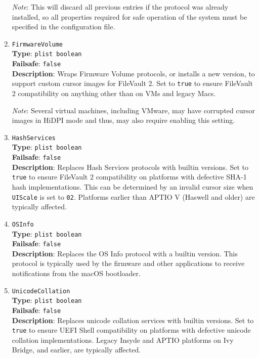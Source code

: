 \documentclass[]{article}
\begin{document}
\begin{enumerate}
  \emph{Note}: This will discard all previous entries if the protocol was already
  installed, so all properties required for safe operation of the system must be
  specified in the configuration file.

\item
  \texttt{FirmwareVolume}\\
  \textbf{Type}: \texttt{plist\ boolean}\\
  \textbf{Failsafe}: \texttt{false}\\
  \textbf{Description}: Wraps Firmware Volume protocols, or installs a new version,
  to support custom cursor images for FileVault 2. Set to \texttt{true} to ensure
  FileVault 2 compatibility on anything other than on VMs and legacy Macs.

  \emph{Note}: Several virtual machines, including VMware, may have corrupted
  cursor images in HiDPI mode and thus, may also require enabling this setting.

\item
  \texttt{HashServices}\\
  \textbf{Type}: \texttt{plist\ boolean}\\
  \textbf{Failsafe}: \texttt{false}\\
  \textbf{Description}: Replaces Hash Services protocols with builtin versions.
  Set to \texttt{true} to ensure FileVault 2 compatibility on platforms with
  defective SHA-1 hash implementations. This can be determined by an invalid
  cursor size when \texttt{UIScale} is set to \texttt{02}. Platforms earlier
  than APTIO V (Haswell and older) are typically affected.

\item
  \texttt{OSInfo}\\
  \textbf{Type}: \texttt{plist\ boolean}\\
  \textbf{Failsafe}: \texttt{false}\\
  \textbf{Description}: Replaces the OS Info protocol with a builtin
  version. This protocol is typically used by the firmware and other
  applications to receive notifications from the macOS bootloader.

\item
  \texttt{UnicodeCollation}\\
  \textbf{Type}: \texttt{plist\ boolean}\\
  \textbf{Failsafe}: \texttt{false}\\
  \textbf{Description}: Replaces unicode collation services with builtin
  versions. Set to \texttt{true} to ensure UEFI Shell compatibility on platforms
  with defective unicode collation implementations. Legacy Insyde and APTIO platforms
  on Ivy Bridge, and earlier, are typically affected.

\end{enumerate}
\end{document}
